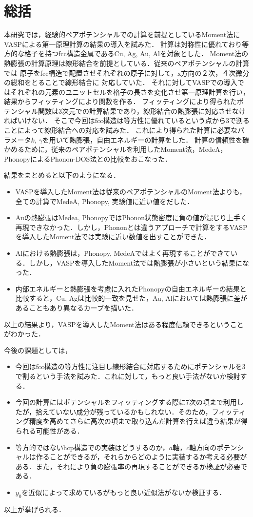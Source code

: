 \chapter{総括}
本研究では，経験的ペアポテンシャルでの計算を前提としているMoment法にVASPによる第一原理計算の結果の導入を試みた．
計算は対称性に優れており等方的な格子を持つfcc構造金属であるCu, Ag, Au, Alを対象とした．
Moment法の熱膨張の計算原理は線形結合を前提としている．従来のペアポテンシャルの計算では
原子をfcc構造で配置させそれぞれの原子に対して，x方向の２次，４次微分の総和をとることで線形結合に
対応していた．
それに対してVASPでの導入ではそれぞれの元素のユニットセルを格子の長さを変化させ第一原理計算を行い，結果からフィッティングにより関数を作る．
フィッティングにより得られたポテンシャル関数は3次元での計算結果であり，線形結合の熱膨張に対応させなければいけない．
そこで今回はfcc構造は等方性に優れているという点から3で割ることによって線形結合への対応を試みた．
これにより得られた計算に必要なパラメータ$k$, $\gamma$を用いて熱膨張，自由エネルギーの計算をした．
計算の信頼性を確かめるために，従来のペアポテンシャルを利用したMoment法，MedeA，PhonopyによるPhonon-DOS法との比較をおこなった．

結果をまとめると以下のようになる．
\begin{itemize}
 \item VASPを導入したMoment法は従来のペアポテンシャルのMoment法よりも，全ての計算でMedeA, Phonopy, 実験値に近い値をだした．
 \item Auの熱膨張はMedea, PhonopyではPhonon状態密度に負の値が混じり上手く再現できなかった．しかし，Phononとは違うアプローチで計算をするVASPを導入したMoment法では実験に近い数値を出すことができた．
  \item Alにおける熱膨張は，Phonopy, MedeAではよく再現することができている．しかし，VASPを導入したMoment法では熱膨張が小さいという結果になった．
 \item 内部エネルギーと熱膨張を考慮に入れたPhonopyの自由エネルギーの結果と比較すると，Cu, Agは比較的一致を見せた，Au, Alにおいては熱膨張に差があることもあり異なるカーブを描いた．
\end{itemize}
以上の結果より，VASPを導入したMoment法はある程度信頼できるということがわかった．

今後の課題としては，

\begin{itemize}
 \item 今回はfcc構造の等方性に注目し線形結合に対応するためにポテンシャルを3で割るという手法を試みた．これに対して，もっと良い手法がないか検討する．
 \item 今回の計算にはポテンシャルをフィッティングする際に7次の項まで利用したが，拾えていない成分が残っているかもしれない．そのため，フィッティング精度を高めてさらに高次の項まで取り込んだ計算を行えば違う結果が得られる可能性がある．
  \item 等方的ではないhcp構造での実装はどうするのか，$a$軸，$c$軸方向のポテンシャルは作ることができるが，それらからどのように実装するか考える必要がある．また，それにより負の膨張率の再現することができるか検証が必要である．
  \item $y_0$を近似によって求めているがもっと良い近似法がないか検証する．
\end{itemize}
以上が挙げられる．



